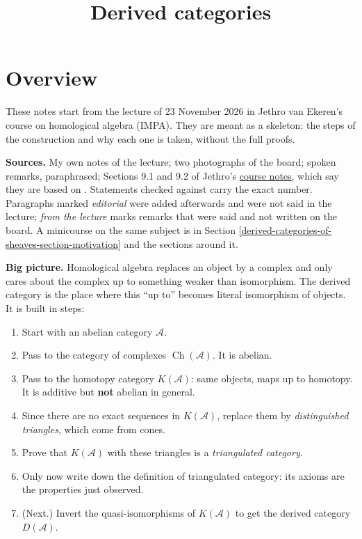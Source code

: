 



\title{Derived categories}
\maketitle

\label{section-phantom}

\tableofcontents

\section{Overview}
\label{section-overview}

\noindent
These notes start from the lecture of
23 November 2026 in Jethro van Ekeren's
course on homological algebra (IMPA).
They are meant as a skeleton: the steps
of the construction and why each one is
taken, without the full proofs.

\medskip\noindent
{\bf Sources.} My own notes of the
lecture; two photographs of the board;
spoken remarks, paraphrased; Sections
9.1 and 9.2 of Jethro's
\href{https://w3.impa.br/~jethro/2026-2/%
ah-current.pdf}{course notes}, which say
they are based on
\cite[Chapter 2]{huybrechts-fm}.
Statements checked against
\cite{huybrechts-fm} carry the exact
number. Paragraphs marked
{\it editorial} were added afterwards
and were not said in the lecture;
{\it from the lecture} marks remarks that
were said and not written on the board.
A minicourse on the same subject is in
Section
\ref{derived-categories-of-sheaves-section-motivation}
and the sections around it.

\medskip\noindent
{\bf Big picture.} Homological algebra
replaces an object by a complex and
only cares about the complex up to
something weaker than isomorphism.
The derived category is the place where
this ``up to'' becomes literal
isomorphism of objects. It is built in
steps:
\begin{enumerate}
\item Start with an abelian category
$\mathcal{A}$.
\item Pass to the category of complexes
$\operatorname{Ch}(\mathcal{A})$. It is
abelian.
\item Pass to the homotopy category
$K(\mathcal{A})$: same objects, maps up
to homotopy. It is additive but {\bf not}
abelian in general.
\item Since there are no exact sequences
in $K(\mathcal{A})$, replace them by
{\it distinguished triangles}, which come
from cones.
\item Prove that $K(\mathcal{A})$ with
these triangles is a
{\it triangulated category}.
\item Only now write down the definition
of triangulated category: its axioms are
the properties just observed.
\item (Next.) Invert the
quasi-isomorphisms of $K(\mathcal{A})$
to get the derived category
$D(\mathcal{A})$.
\end{enumerate}

